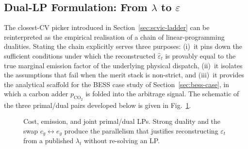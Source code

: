
\subsection{Dual-LP Formulation: From $\lambda$ to $\varepsilon$}
\label{sec:dual-formulation}

The closest-CV picker introduced in
Section~\ref{sec:scvic-ladder} can be reinterpreted as the empirical
realisation of a chain of linear-programming dualities.  Stating the
chain explicitly serves three purposes: (i)~it pins down the
sufficient conditions under which the reconstructed
$\hat\varepsilon_t$ is provably equal to the true marginal emission
factor of the underlying physical dispatch, (ii)~it isolates the
assumptions that fail when the merit stack is non-strict, and
(iii)~it provides the analytical scaffold for the BESS case study of
Section~\ref{sec:bess-case}, in which a carbon adder
$p_{\mathrm{CO}_2}$ is folded into the arbitrage signal.  The
schematic of the three primal/dual pairs developed below is given in
Fig.~\ref{fig:lp-duality}.

\begin{figure}[t]
  \centering
  
  \caption{Cost, emission, and joint primal/dual LPs.
    Strong duality and the swap $c_g\!\leftrightarrow\!e_g$ produce the
    parallelism that justifies reconstructing $\varepsilon_t$ from a
    published $\lambda_t$ without re-solving an LP.}
  \label{fig:lp-duality}
\end{figure}

